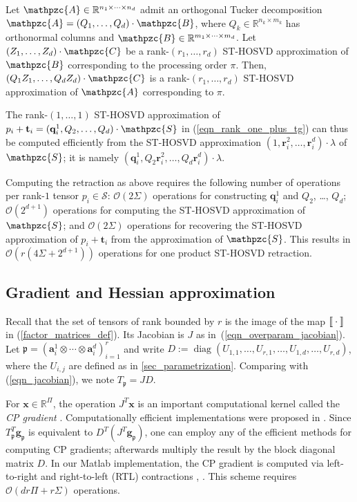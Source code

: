 \documentclass[a4paper,10pt,final]{siamart1116}
\newcommand{\tuple}[1]{\mathfrak{#1}}
\newcommand{\Var}[1]{\mathcal{#1}}
\newcommand{\tensor}[1]{\mathpzc{#1}}
\newcommand{\vect}[1]{\mathbf{#1}}
\newcommand{\sten}[3]{\vect{#1}_{#2}^{#3}}
\newcommand{\R}{\mathbb{R}}
\newcommand{\refeqn}[1]{{(\ref{#1})}}
\newcommand{\refsec}[1]{{\cref{#1}}}
\numberwithin{equation}{section}
\numberwithin{figure}{section}
\numberwithin{table}{section}
\numberwithin{theorem}{section}
\begin{document}
\begin{lemma}\label{lem_sthosvd_compression}
Let $\tensor{A} \in \R^{n_1 \times \cdots \times n_d}$ admit an orthogonal Tucker decomposition $\tensor{A} = (Q_1, \ldots, Q_d) \cdot \tensor{B}$, where $Q_k \in \R^{n_k \times m_k}$ has orthonormal columns and $\tensor{B} \in \R^{m_1 \times \cdots \times m_d}$.
Let $(Z_1, \ldots, Z_d) \cdot \tensor{C}$ be a rank-$(r_1,\ldots,r_d)$ ST-HOSVD approximation of $\tensor{B}$ corresponding to the processing order $\pi$. Then, $(Q_1 Z_1, \ldots, Q_d Z_d) \cdot \tensor{C}$ is a rank-$(r_1,\ldots,r_d)$ ST-HOSVD approximation of $\tensor{A}$ corresponding to $\pi$.
\end{lemma}

The rank-$(1,\ldots,1)$ ST-HOSVD approximation of $p_i + \vect{t}_i = (\sten{q}{i}{1}, Q_2,\ldots,Q_d) \cdot \tensor{S}$ in \refeqn{eqn_rank_one_plus_tg} can thus be computed efficiently from the ST-HOSVD approximation $(1,\sten{r}{i}{2},\ldots,\sten{r}{i}{d}) \cdot \lambda$ of $\tensor{S}$; it is namely $(\sten{q}{i}{1}, Q_2 \sten{r}{i}{2}, \ldots, Q_d \sten{r}{i}{d}) \cdot \lambda$.

Computing the retraction as above requires the following number of operations per rank-$1$ tensor $p_i \in \Var{S}$:
$\mathcal{O}(2\Sigma)$ operations for constructing $\sten{q}{i}{1}$ and $Q_2$, \ldots, $Q_d$; $\mathcal{O}(2^{d+1})$ operations for computing the ST-HOSVD approximation of $\tensor{S}$; and $\mathcal{O}(2 \Sigma)$ operations for recovering the ST-HOSVD approximation of $p_i + \vect{t}_i$ from the approximation of $\tensor{S}$. This results in
\(
 \mathcal{O}( r(4 \Sigma + 2^{d+1}) )
\)
operations for one product ST-HOSVD retraction.

\subsection{Gradient and Hessian approximation} \label{sec_fast_hessian} \label{sec_fast_gradient}
Recall that the set of tensors of rank bounded by $r$ is the image of the map ${\text\textlbrackdbl} \cdot {\text\textrbrackdbl}$ in \refeqn{factor_matrices_def}. Its Jacobian is $J$ as in~\refeqn{eqn_overparam_jacobian}. Let $\tuple{p} = (\sten{a}{i}{1}\otimes\cdots\otimes\sten{a}{i}{d})_{i=1}^r$ and write $D:=\operatorname{diag}(U_{1,1},\ldots,U_{r,1},\ldots,U_{1,d},\ldots,U_{r,d})$, where the $U_{i,j}$ are defined as in \refsec{sec_parametrization}.
Comparing with \refeqn{eqn_jacobian}, we note \(
 T_{\tuple{p}} = J D
\).

For $\vect{x} \in \R^\Pi$, the operation $J^T \vect{x}$ is an important computational kernel called the \emph{CP gradient} \cite{Phan2013}. Computationally efficient implementations were proposed in \cite{Phan2013,VMV2015}. Since $T_{\tuple{p}}^T \vect{g}_{\tuple{p}}$ is equivalent to $D^T (J^T \vect{g}_{\tuple{p}})$, one can employ any of the efficient methods for computing CP gradients; afterwards multiply the result by the block diagonal matrix $D$. In our Matlab implementation, the CP gradient is computed via left-to-right and right-to-left (RTL) contractions \cite{Phan2013}, \cite[section 2.3]{VMV2015}. This scheme requires $\mathcal{O}(d r\Pi + r\Sigma)$ operations.
\end{document}
